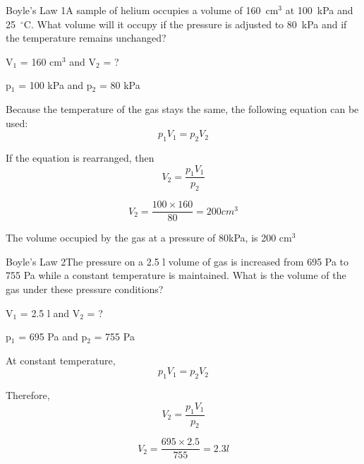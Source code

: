 \begin{wex}{Boyle's Law 1}{A sample of helium occupies a volume of 160~$\mathrm{cm}^3$ at 100~kPa and 25~$^\circ$C. What volume will it occupy if the pressure is adjusted to 80~kPa and if the temperature remains unchanged?\\}
{
V$_{1}$ = 160 cm$^{3}$ and V$_{2}$ = ?

p$_{1}$ = 100 kPa and p$_{2}$ = 80 kPa\\
}
{

Because the temperature of the gas stays the same, the following equation can be used: 
\begin{equation*}
p_{1}V_{1} = p_{2}V_{2}
\end{equation*}

If the equation is rearranged, then
\begin{equation*}
V_{2} = \frac{p_{1}V_{1}}{p_{2}} 
\end{equation*}
}

{
\begin{equation*}
V_{2} = \frac{100 \times 160}{80}
= 200 cm^{3}
\end{equation*}

The volume occupied by the gas at a pressure of 80kPa, is 200 cm$^{3}$
}

\end{wex}

\begin{wex}{Boyle's Law 2}{The pressure on a 2.5 l volume of gas is increased from 695 Pa to 755 Pa while a constant temperature is maintained. What is the volume of the gas under these pressure conditions?\\}

{
V$_{1}$ = 2.5 l and V$_{2}$ = ?

p$_{1}$ = 695 Pa and p$_{2}$ = 755 Pa\\
}
{

At constant temperature, 
\begin{equation*}
p_{1}V_{1} = p_{2}V_{2}
\end{equation*}

Therefore,
\begin{equation*}
V_{2} = \frac{p_{1}V_{1}}{p_{2}} 
\end{equation*}
}

{
\begin{equation*}
V_{2} = \frac{695 \times 2.5}{755}
= 2.3 l
\end{equation*}
}

\end{wex}

